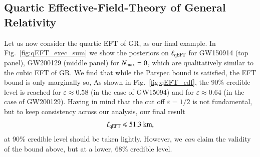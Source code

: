 \documentclass[twocolumn,
               prd,
               aps,
               superscriptaddress,
               tightenlines,
               nofootinbib,
               eqsecnum,
               amsfonts,
               amsmath,
               longbibliography]{revtex4-1}
\begin{document}
\subsection{Quartic Effective-Field-Theory of General Relativity}
\label{sec:results_qeft}

Let us now consider the quartic EFT of GR, as our final example.
%
In Fig.~\ref{fig:qEFT_exec_sum} we show the posteriors on $\ell_{\rm qEFT}$ for GW150914 (top panel),
GW200129 (middle panel) for $N_{\rm max} = 0$, which are qualitatively similar to the cubic EFT of GR.
%
We find that while the Parspec bound is satisfied, the EFT bound is only marginally so,
%
As shown in Fig.~\ref{fig:qEFT_cdf}, the 90\% credible level is reached for $\varepsilon \approx 0.58$
(in the case of GW15094) and for $\varepsilon \approx 0.64$ (in the case of GW200129).
%
Having in mind that the cut off $\varepsilon = 1/2$ is not fundamental, but to keep consistency
across our analysis, our final result
%
\begin{equation}
    \ell_{\rm qEFT} \leqslant 51.3~\textrm{km},
\end{equation}
%
at 90\% credible level should be taken lightly.
%
However, we \emph{can} claim the validity of the bound above, but at a lower,
68\% credible level.
\end{document}
